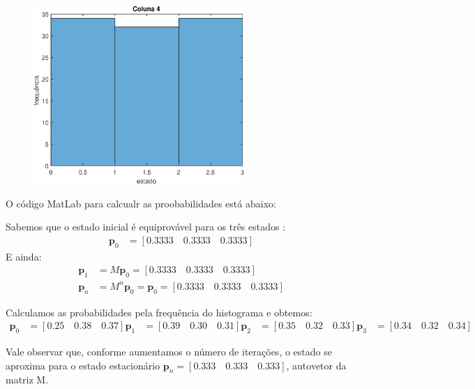 \documentclass[12pt]{article}
\newenvironment{exercise}[2][Exercício]{\begin{trivlist}
\item[\hskip \labelsep {\bfseries #1}\hskip \labelsep {\bfseries #2.}]}{\end{trivlist}}
\begin{document}
\begin{exercise}{1.d}
\begin{figure}[H]
  \centering
  \includegraphics[width=8cm]{figs/ex1_4.eps} 
\end{figure}

O código MatLab para calcualr as proobabilidades está abaixo:


Sabemos que o estado inicial é equiprovável para os três estados :
\begin{align*}
\textbf{p}_0 &= [0.3333 \quad 0.3333 \quad 0.3333]
\end{align*} 
E ainda:
\begin{align*}
\textbf{p}_1 &= M\textbf{p}_0 = [0.3333 \quad 0.3333 \quad
0.3333] \\
\textbf{p}_n &= M^n\textbf{p}_0 = \textbf{p}_0 = [0.3333 \quad 0.3333 \quad
0.3333]
\end{align*}

Calculamos as probabilidades pela frequência do histograma e obtemos:
\begin{align*}
\textbf{p}_0 &= [0.25 \quad 0.38 \quad 0.37]
\textbf{p}_1 &= [0.39 \quad 0.30 \quad 0.31]
\textbf{p}_2 &= [0.35 \quad 0.32 \quad 0.33]
\textbf{p}_3 &= [0.34 \quad 0.32 \quad 0.34]
\end{align*}

Vale observar que, conforme aumentamos o número de iterações, o estado se
aproxima para o estado estacionário $\textbf{p}_n = [0.333 \quad 0.333 \quad
0.333]$, autovetor da matriz M.

\end{exercise}

\begin{exercise}{4}
\end{exercise}

\begin{exercise}{5}
\end{exercise}
 
\end{document}
